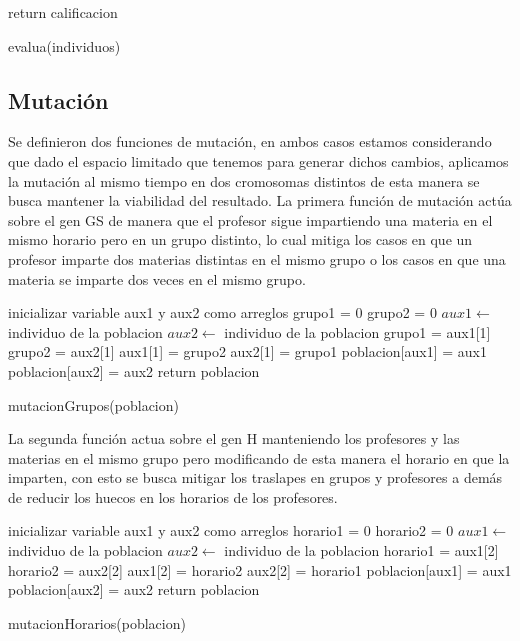 \begin{algorithm}
	\setcounter{AlgoLine}{44}
	\SetAlgoVlined
	return calificacion\;	
	\caption{evalua(individuos)}
\end{algorithm}

\subsection{Mutaci\'on}

Se definieron dos funciones de mutación, en ambos casos estamos considerando que dado el espacio limitado que tenemos para generar dichos cambios, aplicamos la mutación al mismo tiempo en dos cromosomas distintos de esta manera se busca mantener la viabilidad del resultado. La primera función de mutación  actúa sobre el gen GS de manera que el profesor sigue impartiendo una materia en el mismo horario pero en un grupo distinto, lo cual mitiga los casos en que un profesor imparte dos materias distintas en el mismo grupo o los casos en que una materia se imparte dos veces en el mismo grupo.\\ 


\begin{algorithm}[H]
	\DontPrintSemicolon
	\SetAlgoLined
	inicializar variable aux1 y aux2 como arreglos\;
	grupo1 = 0\;
	grupo2 = 0\;
	$aux1 \leftarrow $ individuo de la poblacion\;
	$aux2 \leftarrow $ individuo de la poblacion\;
	grupo1 = aux1[1]\;
	grupo2 = aux2[1]\;
	aux1[1] = grupo2\;
	aux2[1] = grupo1\;
	poblacion[aux1] = aux1\;
	poblacion[aux2] = aux2\;
	return poblacion \;
	\caption{mutacionGrupos(poblacion)}
\end{algorithm}

La segunda función actua sobre el gen H manteniendo los profesores y las materias en el mismo grupo pero modificando de esta manera el horario en que la imparten, con esto se busca mitigar los traslapes en grupos y profesores a demás de reducir los huecos en los horarios de los profesores.\\

\begin{algorithm}[H]
	\DontPrintSemicolon
	\SetAlgoLined
	inicializar variable aux1 y aux2 como arreglos\;
	horario1 = 0\;
	horario2 = 0\;
	$aux1 \leftarrow $ individuo de la poblacion\;
	$aux2 \leftarrow $ individuo de la poblacion\;
	horario1 = aux1[2]\;
	horario2 = aux2[2]\;
	aux1[2] = horario2\;
	aux2[2] = horario1\;
	poblacion[aux1] = aux1\;
	poblacion[aux2] = aux2\;
	return poblacion \;
	\caption{mutacionHorarios(poblacion)}
	\end{algorithm}  